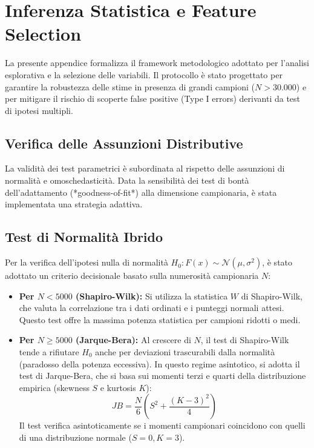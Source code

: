 \setcounter{figure}{0}
\renewcommand{\thefigure}{A.\arabic{figure}}
\setcounter{table}{0}
\renewcommand{\thetable}{A.\arabic{table}}


\section{Inferenza Statistica e Feature Selection}
\label{app:stat_inference}

La presente appendice formalizza il framework metodologico adottato per l'analisi esplorativa e la selezione delle variabili. Il protocollo è stato progettato per garantire la robustezza delle stime in presenza di grandi campioni ($N > 30.000$) e per mitigare il rischio di scoperte false positive (Type I errors) derivanti da test di ipotesi multipli.

\subsection{Verifica delle Assunzioni Distributive}

La validità dei test parametrici è subordinata al rispetto delle assunzioni di normalità e omoschedasticità. Data la sensibilità dei test di bontà dell'adattamento (*goodness-of-fit*) alla dimensione campionaria, è stata implementata una strategia adattiva.

\subsection{Test di Normalità Ibrido}
Per la verifica dell'ipotesi nulla di normalità $H_0: F(x) \sim \mathcal{N}(\mu, \sigma^2)$, è stato adottato un criterio decisionale basato sulla numerosità campionaria $N$:

\begin{itemize}
    \item \textbf{Per $N < 5000$ (Shapiro-Wilk):} Si utilizza la statistica $W$ di Shapiro-Wilk, che valuta la correlazione tra i dati ordinati e i punteggi normali attesi. Questo test offre la massima potenza statistica per campioni ridotti o medi.
    \item \textbf{Per $N \ge 5000$ (Jarque-Bera):} Al crescere di $N$, il test di Shapiro-Wilk tende a rifiutare $H_0$ anche per deviazioni trascurabili dalla normalità (paradosso della potenza eccessiva). In questo regime asintotico, si adotta il test di Jarque-Bera, che si basa sui momenti terzi e quarti della distribuzione empirica (skewness $S$ e kurtosis $K$):
    \begin{equation}
        JB = \frac{N}{6} \left( S^2 + \frac{(K-3)^2}{4} \right)
    \end{equation}
    Il test verifica asintoticamente se i momenti campionari coincidono con quelli di una distribuzione normale ($S=0, K=3$).
\end{itemize}

